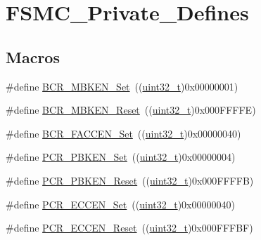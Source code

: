 \hypertarget{group___f_s_m_c___private___defines}{}\section{F\+S\+M\+C\+\_\+\+Private\+\_\+\+Defines}
\label{group___f_s_m_c___private___defines}
\subsection*{Macros}
\begin{DoxyCompactItemize}
\item 
\#define \hyperlink{group___f_s_m_c___private___defines_ga3c427afcf32b17fb72be67fd4638e6d5}{B\+C\+R\+\_\+\+M\+B\+K\+E\+N\+\_\+\+Set}~((\hyperlink{_p_e___types_8h_a33594304e786b158f3fb30289278f5af}{uint32\+\_\+t})0x00000001)
\item 
\#define \hyperlink{group___f_s_m_c___private___defines_gaa63b72d32a32c53a057ee0a45bed0d3b}{B\+C\+R\+\_\+\+M\+B\+K\+E\+N\+\_\+\+Reset}~((\hyperlink{_p_e___types_8h_a33594304e786b158f3fb30289278f5af}{uint32\+\_\+t})0x000\+F\+F\+F\+F\+E)
\item 
\#define \hyperlink{group___f_s_m_c___private___defines_ga38da33a73789b2c932962d75dfc1341f}{B\+C\+R\+\_\+\+F\+A\+C\+C\+E\+N\+\_\+\+Set}~((\hyperlink{_p_e___types_8h_a33594304e786b158f3fb30289278f5af}{uint32\+\_\+t})0x00000040)
\item 
\#define \hyperlink{group___f_s_m_c___private___defines_gade871050f882b7f48582084b0e95f67c}{P\+C\+R\+\_\+\+P\+B\+K\+E\+N\+\_\+\+Set}~((\hyperlink{_p_e___types_8h_a33594304e786b158f3fb30289278f5af}{uint32\+\_\+t})0x00000004)
\item 
\#define \hyperlink{group___f_s_m_c___private___defines_gac6d0ddc3888a0554b032f0f484cfe332}{P\+C\+R\+\_\+\+P\+B\+K\+E\+N\+\_\+\+Reset}~((\hyperlink{_p_e___types_8h_a33594304e786b158f3fb30289278f5af}{uint32\+\_\+t})0x000\+F\+F\+F\+F\+B)
\item 
\#define \hyperlink{group___f_s_m_c___private___defines_ga8a0d7950936e3869b449d421e03a19ac}{P\+C\+R\+\_\+\+E\+C\+C\+E\+N\+\_\+\+Set}~((\hyperlink{_p_e___types_8h_a33594304e786b158f3fb30289278f5af}{uint32\+\_\+t})0x00000040)
\item 
\#define \hyperlink{group___f_s_m_c___private___defines_gaca1a5c5cd46c8a32dab58c3eb3b865fa}{P\+C\+R\+\_\+\+E\+C\+C\+E\+N\+\_\+\+Reset}~((\hyperlink{_p_e___types_8h_a33594304e786b158f3fb30289278f5af}{uint32\+\_\+t})0x000\+F\+F\+F\+B\+F)
\item 

\end{DoxyCompactItemize}
